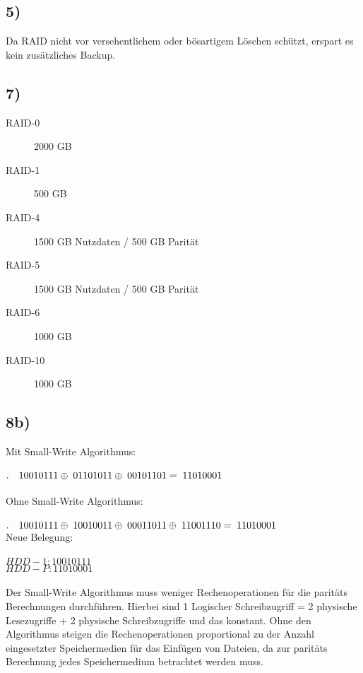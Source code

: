 \documentclass[ngerman]{fbi-aufgabenblatt}
\begin{document}
\subsection*{5)}
Da RAID nicht vor versehentlichem oder bösartigem Löschen schützt, erspart es kein zusätzliches Backup.

\subsection*{7)}
\begin{description}
	\item[RAID-0] 2000 GB
	\item [RAID-1] 500 GB
	\item [RAID-4] 1500 GB Nutzdaten / 500 GB Parität
	\item [RAID-5] 1500 GB Nutzdaten / 500 GB Parität
	\item [RAID-6] 1000 GB
	\item[RAID-10] 1000 GB
\end{description} 

\subsection*{8b)}

Mit Small-Write Algorithmus:\\\\
$.\quad 10010111 \\\oplus \; 01101011 \\ \oplus \; 00101101\\ = \; 11010001$\\\\
Ohne Small-Write Algorithmus:\\\\
$.\quad 10010111 \\\oplus \; 10010011 \\\oplus \; 00011011\\ \oplus \; 11001110 \\= \; 11010001$\\

Neue Belegung:\\\\
$HDD-1 : 10010111$\\
$HDD-P : 11010001$\\\\
Der Small-Write Algorithmus muss weniger Rechenoperationen für die paritäts Berechnungen durchführen. Hierbei sind 1 Logischer Schreibzugriff = 2 physische Lesezugriffe + 2 physische Schreibzugriffe und das konstant. Ohne den Algorithmus steigen die Rechenoperationen proportional zu der Anzahl eingesetzter Speichermedien für das Einfügen von Dateien, da zur paritäts Berechnung jedes Speichermedium betrachtet werden muss.
\end{document}

